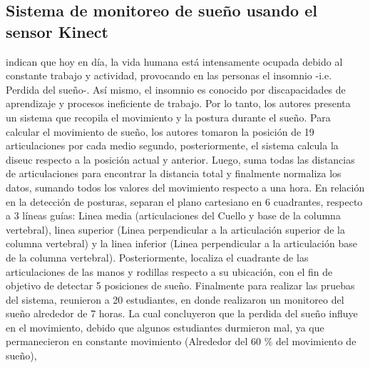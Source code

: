 \subsection{Sistema de monitoreo de sue\~no usando el sensor Kinect} \label{tr:5}
 indican que hoy en d\'ia, la vida humana est\'a intensamente ocupada debido al constante trabajo y actividad, provocando en las personas el insomnio -i.e. Perdida del sue\~no-. As\'i mismo, el insomnio es conocido por discapacidades de aprendizaje y procesos ineficiente de trabajo. Por lo tanto, los autores presenta un sistema que recopila el movimiento y la postura durante el sue\~no.
\medbreak
Para calcular el movimiento de sue\~no, los autores tomaron la posici\'on de 19 articulaciones por cada medio segundo, posteriormente, el sistema calcula la \gls{diseuc} respecto a la posici\'on actual y anterior. Luego, suma todas las distancias de articulaciones para encontrar la distancia total y finalmente normaliza los datos, sumando todos los valores del movimiento respecto a una hora.
\medbreak
En relaci\'on en la detecci\'on de posturas,  separan el plano cartesiano en 6 cuadrantes, respecto a 3 l\'ineas gu\'ias: Linea media (articulaciones del Cuello y base de la columna vertebral), linea superior (Linea perpendicular a la articulaci\'on superior  de la columna vertebral) y la linea inferior (Linea perpendicular a la articulaci\'on base  de la columna vertebral). Posteriormente, localiza el cuadrante de las articulaciones de las manos y rodillas respecto a su ubicaci\'on, con el fin de objetivo de detectar 5 posiciones de sue\~no.
\medbreak
Finalmente para realizar las pruebas del sistema, reunieron a 20 estudiantes, en donde realizaron un monitoreo del sue\~no alrededor de 7 horas. La cual concluyeron que la perdida del sue\~no influye en el movimiento, debido que algunos estudiantes durmieron mal, ya que permanecieron en constante movimiento (Alrededor del 60 \% del  movimiento de sue\~no),
